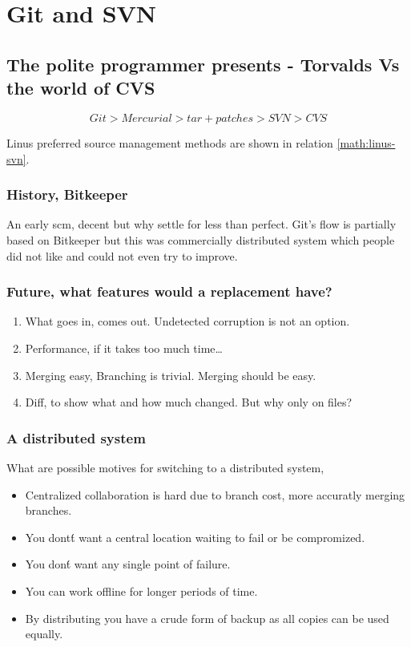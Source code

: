 
\section{Git and SVN}

\subsection{The polite programmer presents - Torvalds Vs the world of CVS}

\[
Git >  Mercurial > tar+patches > SVN > CVS
\label{math:linus-svn}
\]

Linus preferred source management methods are shown in relation \ref{math:linus-svn}.


\subsubsection{History, Bitkeeper}
An early scm, decent but why settle for less than perfect.
Git's flow is partially based on Bitkeeper but this was commercially distributed system which people did not like and could not even try to improve.

\subsubsection{Future, what features would a replacement have?}

\begin{enumerate}
  \item What goes in, comes out. Undetected corruption is not an option.
  \item Performance, if it takes too much time\ldots
  \item Merging easy, Branching is trivial. Merging should be easy.
  \item Diff, to show what and how much changed. But why only on files?
\end{enumerate}

\subsubsection{A distributed system}
What are possible motives for switching to a distributed system,
\begin{itemize}
 \item Centralized collaboration is hard due to branch cost, more accuratly merging branches.
 \item You dont\'t want a central location waiting to fail or be compromized.
 \item You don\'t want any single point of failure.
 \item You can work offline for longer periods of time.
 \item By distributing you have a crude form of backup as all copies can be used equally.
\end{itemize}

